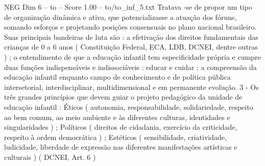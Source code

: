 \begin{textsample}{NEG Dim 6 – to – Score 1.00 – to/to\_inf\_5.txt}
Tratava -se de propor um tipo de organização dinâmica e ativa, que potencializasse a atuação dos fóruns, somando esforços e projetando posições consensuais no plano nacional brasileiro.
Suas principais bandeiras de luta são : a efetivação dos direitos fundamentais das crianças de 0 a 6 anos ( Constituição Federal, ECA, LDB, DCNEI, dentre outras ) ; o entendimento de que a educação infantil tem especificidade própria e cumpre duas funções indispensáveis e indissociáveis : educar e cuidar ; a compreensão da educação infantil enquanto campo de conhecimento e de política pública intersetorial, interdisciplinar, multidimensional e em permanente evolução. 3 - Os três grandes princípios que devem guiar o projeto pedagógico da unidade de educação infantil : Éticos ( autonomia, responsabilidade, solidariedade, respeito ao bem comum, ao meio ambiente e às diferentes culturas, identidades e singularidades ) ; Políticos ( direitos de cidadania, exercício da criticidade, respeito à ordem democrática ) ; Estéticos ( sensibilidade, criatividade, ludicidade, liberdade de expressão nas diferentes manifestações artísticas e culturais ) ( DCNEI, Art. 6 )

\end{textsample}
